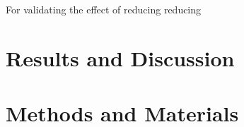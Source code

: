 \documentclass[12pt]{article}
\begin{document}
For validating the effect of reducing reducing 

\section{Results and Discussion}
\section{Methods and Materials}
\clearpage

\end{document}
